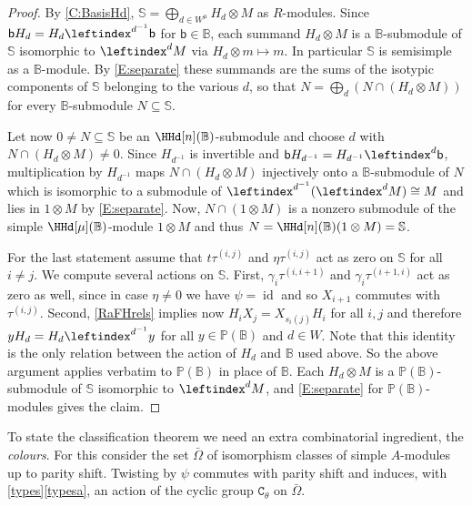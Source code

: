 \documentclass[a4paper,11pt]{amsart}
\numberwithin{equation}{subsection}
\theoremstyle{definition}
\theoremstyle{theorem}
\theoremstyle{remark}
\newcommand\Sym{W}
\newcommand\bb{\mathsf{b}}
\newcommand\op{\operatorname}
\newcommand\Po{\mathbb{P}(\mathbb{B})}
\newcommand{\Bo}{\mathbb{B}}
\newcommand{\So}{\mathbb{S}}
\begin{document}
\begin{proof}
By \autoref{C:BasisHd}, $\So=\bigoplus_{d\in \Sym^{\mu}}H_d\otimes M$ as $R$-modules.
Since $\bb H_d=H_d\leftindex^{d^{-1}}\bb$ for
  $\bb\in\Bo$, each summand $H_d\otimes M$ is a $\Bo$-submodule of
  $\So$ isomorphic to $\leftindex^{d}M$ via $H_d\otimes m\mapsto m$. In
  particular $\So$ is semisimple as a $\Bo$-module.  By
  \autoref{E:separate} these summands are the sums of the isotypic
  components of $\So$ belonging to the various
  $d$, so that $N=\bigoplus_d\left(N\cap(H_d\otimes M)\right)$ for every
  $\Bo$-submodule $N\subseteq\So$.

  Let now $0\ne N\subseteq\So$ be an $\HHd[n](\Bo)$-submodule and choose
  $d$ with $N\cap(H_d\otimes M)\ne0$. Since $H_{d^{-1}}$ is invertible and $\bb H_{d^{-1}}=H_{d^{-1}}\leftindex^{d}\bb$, multiplication by $H_{d^{-1}}$ maps $N\cap(H_d\otimes M)$ injectively onto a $\Bo$-submodule of $N$ which is isomorphic to a submodule of $\leftindex^{d^{-1}}(\leftindex^{d}M)\cong M$ and lies in $1\otimes M$ by \autoref{E:separate}. Now,
  $N\cap(1\otimes M)$ is a nonzero submodule of the simple
  $\HHd[\mu](\Bo)$-module $1\otimes M$ and thus
  $N=\HHd[n](\Bo)(1\otimes M)=\So$.

    For the last statement assume that $t\tau^{(i,j)}$ and $\eta\tau^{(i,j)}$ act as zero on $\So$ for all $i\ne j$. We compute several actions on $\So$. First,  $\gamma_i\tau^{(i,i+1)}$ and $\gamma_i\tau^{(i+1,i)}$ act as zero as well, since in case $\eta\ne0$ we have $\psi=\op{id}$ and so  $X_{i+1}$ commutes with $\tau^{(i,j)}$.
    Second,  \autoref{RaFHrels} implies now $H_iX_j=X_{s_i(j)}H_i$ for all $i,j$ and therefore $yH_d=H_d\leftindex^{d^{-1}}y$ for all $y\in\Po$ and $d\in\Sym$. Note that  this identity is the only relation between the action of $H_d$ and $\Bo$ used above. So the above  argument applies verbatim to $\Po$ in place of $\Bo$. Each $H_d\otimes M$ is a $\Po$-submodule of $\So$ isomorphic to $\leftindex^{d}M$, and \autoref{E:separate} for $\Po$-modules gives the claim.
\end{proof}

To state the classification theorem we need an extra combinatorial ingredient, the \emph{colours}. For this consider the set  $\bar\Omega$ of isomorphism classes of simple $A$-modules up to parity shift. Twisting by $\psi$ commutes with parity shift and induces, with \autoref{types}\autoref{typesa}, an action of the cyclic group $\mathtt{C}_\theta$ on $\bar\Omega$.
\end{document}
